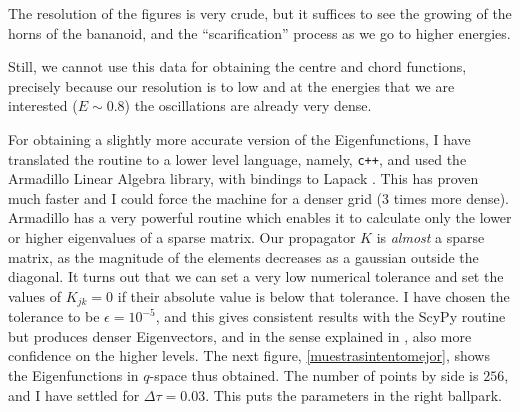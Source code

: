 \documentclass[a4paper,12pt]{article}
\newcommand{\dt}{\Delta\tau}
\begin{document}
The resolution of the figures is very crude, but it suffices to
see the growing of the horns of the bananoid, and the ``scarification'' process
as we go to higher energies. 

Still, we cannot use this data for obtaining the centre and chord
functions, precisely because our resolution is to low and at the
energies that we are interested ($E\sim 0.8$) the oscillations are already
very dense. 

For obtaining a slightly more accurate version of the Eigenfunctions,
I have translated the routine to a lower level language, namely,
\verb!c++!, and used the Armadillo Linear Algebra library, with bindings to
Lapack \cite{armadillo}. This has proven much faster and I could force the
machine for a denser grid (3 times more dense). Armadillo has a very
powerful routine which enables it to calculate only the lower or higher
eigenvalues of a sparse matrix. Our propagator $K$ is \emph{almost}
a sparse matrix, as the magnitude of the elements decreases as a gaussian
outside the diagonal. It turns out that we can set a very low numerical
tolerance and set the values of $K_{jk}=0$ if their absolute value is
below that tolerance. I have chosen the tolerance to be 
$\epsilon=10^{-5}$, and this gives consistent results with
the ScyPy routine but produces denser Eigenvectors, and in the
sense explained in \cite{Hernando}, also more confidence 
on the higher levels. The next figure, \ref{muestrasintentomejor},
shows the Eigenfunctions in $q$-space thus obtained. The number of points
by side is $256$, and I have settled for $\dt=0.03$. This puts the 
parameters in the right ballpark.
\end{document}
